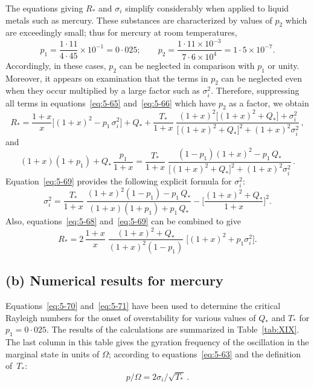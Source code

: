 The equations giving $R_*$ and $\sigma_i$ simplify considerably when applied
to liquid metals such as mercury. These substances are characterized by
values of $p_2$ which are exceedingly small; thus for mercury at room
temperatures,
\begin{equation}
p_1 = \frac{1{\cdot}11}{4{\cdot}45}\times 10^{-1} = 0{\cdot}025;\qquad
p_2 = \frac{1{\cdot}11 \times 10^{-3}}{7{\cdot}6 \times 10^{4}} = 1{\cdot}5\times 10^{-7}.
\label{eq:5-67}
\end{equation}
Accordingly, in these cases, $p_2$ can be neglected in comparison with $p_1$
or unity. Moreover, it appears on examination that the terms in $p_2$ can
be neglected even when they occur multiplied by a large factor such as
$\sigma_i^2$. Therefore, suppressing all terms in equations~\eqref{eq:5-65}
and~\eqref{eq:5-66} which have $p_2$ as a factor, we obtain
\begin{equation}
R_* = \frac{1+x}{x}\bigl[(1{+}x)^2 - p_1\,\sigma_i^2\bigr]
+ Q_* + \frac{T_*}{1{+}x}\;\frac{(1{+}x)^2\bigl[(1{+}x)^2{+}Q_*\bigr]{+}\sigma_i^2}
{\bigl[(1{+}x)^2{+}Q_*\bigr]^2{+}(1{+}x)^2\sigma_i^2}\,,
\label{eq:5-68}
\end{equation}
and
\begin{equation}
(1{+}x)(1{+}p_1){+}Q_*\,\frac{p_1}{1{+}x} = \frac{T_*}{1{+}x}\;
\frac{(1{-}p_1)(1{+}x)^2 - p_1\,Q_*}
{\bigl[(1{+}x)^2{+}Q_*\bigr]^2{+}(1{+}x)^2\sigma_i^2}\,.
\label{eq:5-69}
\end{equation}
Equation~\eqref{eq:5-69} provides the following explicit formula for $\sigma_i^2$:
\begin{equation}
\sigma_i^2 = \frac{T_*}{1{+}x}\;
\frac{(1{+}x)^2(1{-}p_1) - p_1\,Q_*}{(1{+}x)(1{+}p_1)+p_1\,Q_*}
- \biggl[\frac{(1{+}x)^2{+}Q_*}{1{+}x}\biggr]^2.
\label{eq:5-70}
\end{equation}
Also, equations~\eqref{eq:5-68} and~\eqref{eq:5-69} can be combined to give
\begin{equation}
R_* = 2\,\frac{1+x}{x}\;\frac{(1{+}x)^2{+}Q_*}
{(1{+}x)^2(1{-}p_1)}\;\bigl[(1{+}x)^2{+}p_1\sigma_i^2\bigr].
\label{eq:5-71}
\end{equation}

\subsection*{(b) Numerical results for mercury}

Equations~\eqref{eq:5-70} and~\eqref{eq:5-71} have been used to determine the critical
Rayleigh numbers for the onset of overstability for various values of
$Q_*$ and $T_*$ for $p_1 = 0{\cdot}025$. The results of the calculations are summarized
in Table~\ref{tab:XIX}. The last column in this table gives the gyration frequency
of the oscillation in the marginal state in units of $\Omega$; according to equations~\eqref{eq:5-63} and the definition of~$T_*$:
\begin{equation}
p/\Omega = 2\sigma_i/\!\sqrt{T_*}\,.
\label{eq:5-72}
\end{equation}

